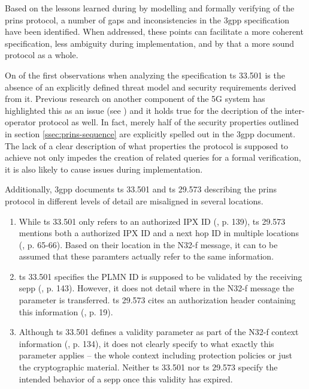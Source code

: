 Based on the lessons learned during by modelling and formally verifying of the \gls{prins} protocol, a number of gaps and inconsistencies in the \gls{3gpp} specification have been identified.
When addressed, these points can facilitate a more coherent specification, less ambiguity during implementation, and by that a more sound protocol as a whole.

On of the first observations when analyzing the specification \gls{ts} 33.501 is the absence of an explicitly defined threat model and security requirements derived from it.
Previous research on another component of the 5G system has highlighted this as an issue (see \cite{basin2018model}) and it holds true for the decription of the inter-operator protocol as well.
In fact, merely half of the security properties outlined in section \ref{ssec:prins-sequence} are explicitly spelled out in the \gls{3gpp} document.
The lack of a clear description of what properties the protocol is supposed to achieve not only impedes the creation of related queries for a formal verification, it is also likely to cause issues during implementation.

Additionally, \gls{3gpp} documents \gls{ts} 33.501 and \gls{ts} 29.573 describing the \gls{prins} protocol in different levels of detail are misaligned in several locations.

\begin{enumerate}[label=--]
\item While  \gls{ts} 33.501 only refers to an {\sffamily authorized IPX ID} (\cite{3gpp.33.501}, p. 139), \gls{ts} 29.573 mentions both a {\sffamily authorized IPX ID} and a {\sffamily next hop ID} in multiple locations (\cite{3gpp.29.573}, p. 65-66). Based on their location in the N32-f message, it can to be assumed that these paramters actually refer to the same information.

\item \gls{ts} 33.501 specifies the {\sffamily PLMN ID} is supposed to be validated by the receiving \gls{sepp} (\cite{3gpp.33.501}, p. 143). However, it does not detail where in the N32-f message the parameter is transferred. \gls{ts} 29.573 cites an authorization header containing this information (\cite{3gpp.29.573}, p. 19).

\item Although \gls{ts} 33.501 defines a validity parameter as part of the N32-f context information (\cite{3gpp.33.501}, p. 134), it does not clearly specify to what exactly this parameter applies -- the whole context including protection policies or just the cryptographic material. Neither \gls{ts} 33.501 nor \gls{ts} 29.573 specify the intended behavior of a \gls{sepp} once this validity has expired.
\end{enumerate}

